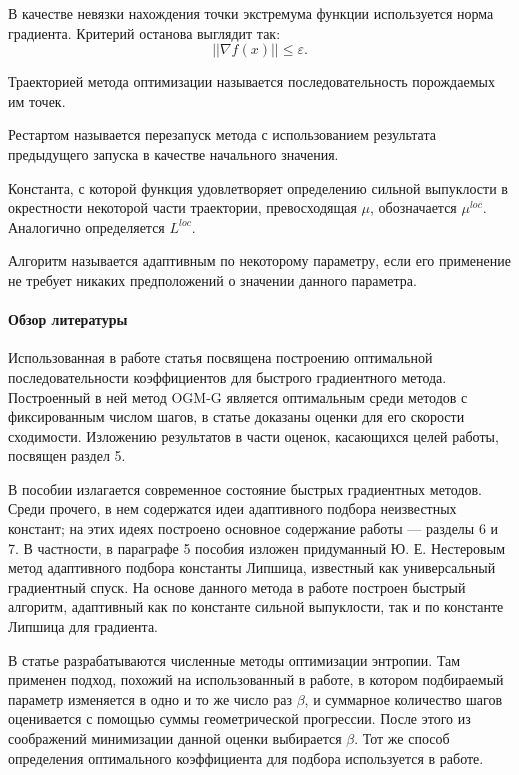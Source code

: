 \documentclass{crm-article}
\begin{document}
В качестве невязки нахождения точки экстремума функции используется норма градиента. Критерий останова выглядит так:
\begin{equation}
||\nabla f(x)||\leq\varepsilon.
\end{equation}

Траекторией метода оптимизации называется последовательность порождаемых им точек.

Рестартом называется перезапуск метода с использованием
результата предыдущего запуска в качестве начального значения.

Константа, с которой функция удовлетворяет определению сильной выпуклости в окрестности некоторой части траектории, превосходящая $\mu$, обозначается $\mu^{loc}$. Аналогично определяется $L^{loc}$.

Алгоритм называется адаптивным по некоторому параметру, если его применение не требует никаких предположений о значении данного параметра.

\paragraph{Обзор литературы}

Использованная в работе статья \cite{kim2018fessler} посвящена построению оптимальной последовательности коэффициентов для быстрого градиентного метода. Построенный в ней метод OGM-G является оптимальным среди методов с фиксированным числом шагов, в статье доказаны оценки для его скорости сходимости. Изложению результатов \cite{kim2018fessler} в части оценок, касающихся целей работы, посвящен раздел 5.

В пособии \cite{gasnikov2017universal} излагается современное состояние быстрых градиентных методов. Среди прочего, в нем содержатся идеи адаптивного подбора неизвестных констант; на этих идеях построено основное содержание работы --- разделы 6 и 7. В частности, в параграфе 5 пособия изложен придуманный Ю. Е. Нестеровым метод адаптивного подбора константы Липшица, известный как универсальный градиентный спуск. На основе данного метода в работе построен быстрый алгоритм, адаптивный как по константе сильной выпуклости, так и по константе Липшица для градиента.

В статье \cite{gasnikov2018entropy} разрабатываются численные методы оптимизации энтропии. Там применен подход, похожий на использованный в работе, в котором подбираемый параметр изменяется в одно и то же число раз $\beta$, и суммарное количество шагов оценивается с помощью суммы геометрической прогрессии. После этого из соображений минимизации данной оценки выбирается $\beta$. Тот же способ определения оптимального коэффициента для подбора используется в работе.
\end{document}
